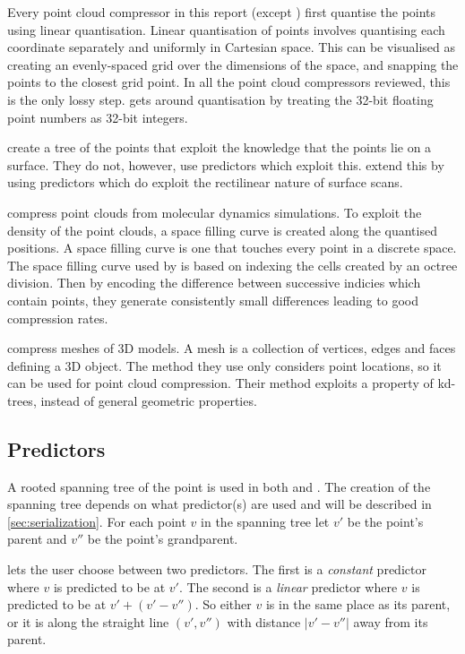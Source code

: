 \documentclass{report}
\begin{document}
Every point cloud compressor in this report (except \citep{chen2005lcp}) first
quantise the points using linear quantisation. Linear quantisation of points
involves quantising each coordinate separately and uniformly in Cartesian
space. This can be visualised as creating an evenly-spaced grid over the
dimensions of the space, and snapping the points to the closest grid point. In
all the point cloud compressors reviewed, this is the only lossy
step. \citep{chen2005lcp} gets around quantisation by treating the 32-bit
floating point numbers as 32-bit integers.

\citep{gumholdcomp} create a tree of the points that exploit the knowledge that
the points lie on a surface. They do not, however, use predictors which
exploit this. \citep{merrycomp} extend this by using predictors which do
exploit the rectilinear nature of surface scans.

\citep{omeltchenko2000sls} compress point clouds from molecular dynamics
simulations. To exploit the density of the point clouds, a space filling curve
is created along the quantised positions. A space filling curve is one that
touches every point in a discrete space. The space filling curve used by
\citep{omeltchenko2000sls} is based on indexing the cells created by an octree
division. Then by encoding the difference between successive indicies which
contain points, they generate consistently small differences leading to good
compression rates.

\citep{devillers2000gci} compress meshes of 3D models. A mesh is a collection
of vertices, edges and faces defining a 3D object. The method they use only
considers point locations, so it can be used for point cloud
compression. Their method exploits a property of kd-trees, instead of general
geometric properties.


\subsection{Predictors}

A rooted spanning tree of the point is used in both \citep{gumholdcomp} and
\citep{merrycomp}. The creation of the spanning tree depends on what
predictor(s) are used and will be described in \ref{sec:serialization}. For
each point $v$ in the spanning tree let $v'$ be the point's parent and $v''$
be the point's grandparent.

\citep{gumholdcomp} lets the user choose between two predictors. The first is
a \emph{constant} predictor where $v$ is predicted to be at $v'$. The second
is a \emph{linear} predictor where $v$ is predicted to be at $v' + (v' -
v'')$. So either $v$ is in the same place as its parent, or it is along the
straight line $(v', v'')$ with distance $|v'-v''|$ away from its parent.
\end{document}
